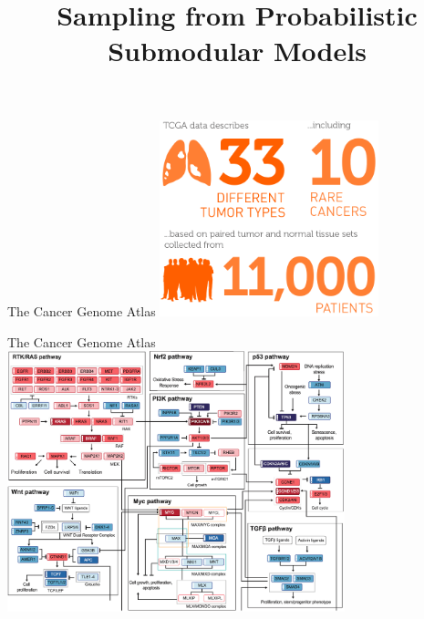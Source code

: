 \documentclass[mathserif]{beamer}
\title[Sampling from Probabilistic Submodular Models]
{Sampling from Probabilistic Submodular Models}
\author[Alkis Gotovos]{}
\begin{document}



\begin{frame}{The Cancer Genome Atlas}
\vspace{0.5em}
\centering
\includegraphics[width=2.5in]{figures/tcga.png}\\[-0.3em]
\hspace{12em}
\end{frame}

\begin{frame}{The Cancer Genome Atlas}
\vspace{0.3em}
\centering
\includegraphics[width=3.85in]{figures/pathways_new.png}\\[-0.7em]
\hspace{22em}
\end{frame}
\end{document}
